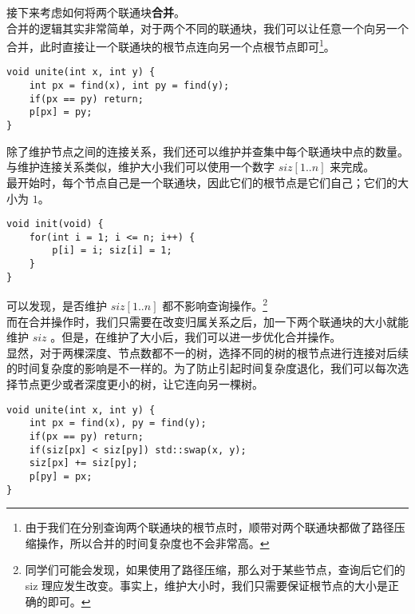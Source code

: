 \documentclass{beamer}
\newcommand{\fdf}[1]{\alert{\textbf{#1}}}
\begin{document}
\begin{frame}[fragile]
接下来考虑如何将两个联通块\fdf{合并}。\\ 
合并的逻辑其实非常简单，对于两个不同的联通块，我们可以让任意一个向另一个合并，此时直接让一个联通块的根节点连向另一个点根节点即可\footnote{由于我们在分别查询两个联通块的根节点时，顺带对两个联通块都做了路径压缩操作，所以合并的时间复杂度也不会非常高。}。
\begin{onlyenv}
\begin{verbatim}
void unite(int x, int y) {
    int px = find(x), int py = find(y);
    if(px == py) return;
    p[px] = py;
}
\end{verbatim}
\end{onlyenv}
\end{frame}
\begin{frame}[fragile]
除了维护节点之间的连接关系，我们还可以维护并查集中每个联通块中点的数量。\\ 
与维护连接关系类似，维护大小我们可以使用一个数字 $siz[1..n]$ 来完成。\\ 
最开始时，每个节点自己是一个联通块，因此它们的根节点是它们自己；它们的大小为 $1$。
\begin{onlyenv}
\begin{verbatim}
void init(void) {
    for(int i = 1; i <= n; i++) {
        p[i] = i; siz[i] = 1;
    }
}
\end{verbatim}
\end{onlyenv}
\end{frame}
\begin{frame}[fragile]
可以发现，是否维护 $siz[1..n]$ 都不影响查询操作。\footnote{同学们可能会发现，如果使用了路径压缩，那么对于某些节点，查询后它们的 siz 理应发生改变。事实上，维护大小时，我们只需要保证根节点的大小是正确的即可。} \\
而在合并操作时，我们只需要在改变归属关系之后，加一下两个联通块的大小就能维护 $siz$ 。但是，在维护了大小后，我们可以进一步优化合并操作。\\
显然，对于两棵深度、节点数都不一的树，选择不同的树的根节点进行连接对后续的时间复杂度的影响是不一样的。为了防止引起时间复杂度退化，我们可以每次选择节点更少或者深度更小的树，让它连向另一棵树。
\begin{onlyenv}
\begin{verbatim}
void unite(int x, int y) {
    int px = find(x), py = find(y);
    if(px == py) return;
    if(siz[px] < siz[py]) std::swap(x, y);
    siz[px] += siz[py];
    p[py] = px;
}
\end{verbatim}
\end{onlyenv}
\end{frame}
\end{document}
